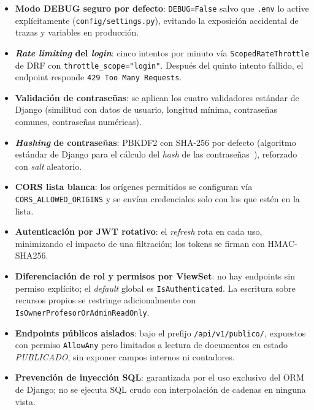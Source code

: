 \begin{itemize}
    \item \textbf{Modo DEBUG seguro por defecto}: \texttt{DEBUG=False} salvo que \texttt{.env} lo active explícitamente (\texttt{config/settings.py}), evitando la exposición accidental de trazas y variables en producción.
    \item \textbf{\emph{Rate limiting} del \emph{login}}: cinco intentos por minuto vía \texttt{ScopedRateThrottle} de DRF con \texttt{throttle\_scope="login"}. Después del quinto intento fallido, el endpoint responde \texttt{429 Too Many Requests}.
    \item \textbf{Validación de contraseñas}: se aplican los cuatro validadores estándar de Django (similitud con datos de usuario, longitud mínima, contraseñas comunes, contraseñas numéricas).
    \item \textbf{\emph{Hashing} de contraseñas}: PBKDF2 con SHA-256 por defecto (algoritmo estándar de Django para el cálculo del \emph{hash} de las contraseñas~\cite{rfc8018}), reforzado con \emph{salt} aleatorio.
    \item \textbf{CORS lista blanca}: los orígenes permitidos se configuran vía \texttt{CORS\_ALLOWED\_ORIGINS} y se envían credenciales solo con los que estén en la lista.
    \item \textbf{Autenticación por JWT rotativo}: el \emph{refresh} rota en cada uso, minimizando el impacto de una filtración; los tokens se firman con HMAC-SHA256.
    \item \textbf{Diferenciación de rol y permisos por ViewSet}: no hay endpoints sin permiso explícito; el \emph{default} global es \texttt{IsAuthenticated}. La escritura sobre recursos propios se restringe adicionalmente con \texttt{IsOwnerProfesorOrAdminReadOnly}.
    \item \textbf{Endpoints públicos aislados}: bajo el prefijo \texttt{/api/v1/publico/}, expuestos con permiso \texttt{AllowAny} pero limitados a lectura de documentos en estado \emph{PUBLICADO}, sin exponer campos internos ni contadores.
    \item \textbf{Prevención de inyección SQL}: garantizada por el uso exclusivo del ORM de Django; no se ejecuta SQL crudo con interpolación de cadenas en ninguna vista.
\end{itemize}

\newpage
